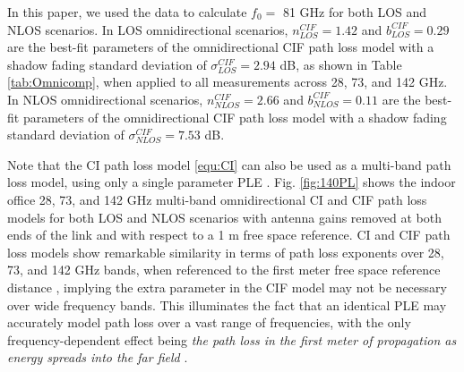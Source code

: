 \documentclass[conference]{IEEEtran}
\begin{document}

In this paper, we used the data to calculate $f_0 =$ 81 GHz for both LOS and NLOS scenarios. In LOS omnidirectional scenarios, $n^{CIF}_{LOS}=1.42$ and $b^{CIF}_{LOS}=0.29$ are the best-fit parameters of the omnidirectional CIF path loss model with a shadow fading standard deviation of $\sigma^{CIF}_{LOS} = 2.94$ dB, as shown in Table \ref{tab:Omnicomp}, when applied to all measurements across 28, 73, and 142 GHz. In NLOS omnidirectional scenarios, $n^{CIF}_{NLOS}=2.66$ and $b^{CIF}_{NLOS}=0.11$ are the best-fit parameters of the omnidirectional CIF path loss model with a shadow fading standard deviation of $\sigma^{CIF}_{NLOS} = 7.53$ dB.


Note that the CI path loss model \eqref{equ:CI} can also be used as a multi-band path loss model, using only a single parameter PLE \cite{Mac15b, Samimi15b, Sun16b}. Fig. \ref{fig:140PL} shows the indoor office 28, 73, and 142 GHz multi-band omnidirectional CI and CIF path loss models for both LOS and NLOS scenarios with antenna gains removed at both ends of the link and with respect to a 1 m free space reference. CI and CIF path loss models show remarkable similarity in terms of path loss exponents over 28, 73, and 142 GHz bands, when referenced to the first meter free space reference distance \cite{Sun16b,Mac15b,Samimi15b}, implying the extra parameter in the CIF model may not be necessary over wide frequency bands. This illuminates the fact that an identical PLE may accurately model path loss over a vast range of frequencies, with the only frequency-dependent effect being \textit{the path loss in the first meter of propagation as energy spreads into the far field} \cite{xing21a,Mac15b, Samimi15b, Sun16b}. 



\end{document}
